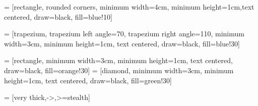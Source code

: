
 = [rectangle, rounded corners, minimum width=4cm, minimum height=1cm,text centered, draw=black, fill=blue!10]

 = [trapezium, trapezium left angle=70, trapezium right angle=110, minimum width=3cm, minimum height=1cm, text centered, draw=black, fill=blue!30]

 = [rectangle, minimum width=3cm, minimum height=1cm, text centered, draw=black, fill=orange!30]
 = [diamond, minimum width=3cm, minimum height=1cm, text centered, draw=black, fill=green!30]

 = [very thick,->,>=stealth]

